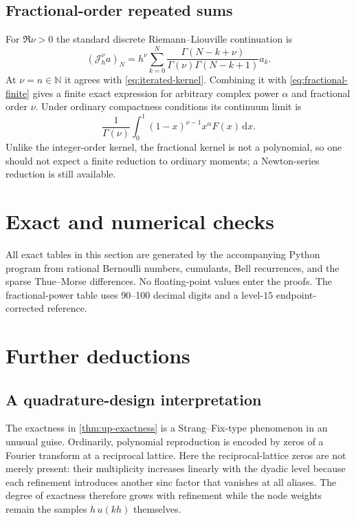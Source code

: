 \documentclass[11pt]{article}
\theoremstyle{definition}
\theoremstyle{remark}
\newcommand{\N}{\mathbb N}
\newcommand{\dd}{\,\mathrm d}
\newcommand{\J}{\mathcal J}
\begin{document}
\subsection{Fractional-order repeated sums}

For $\Re\nu>0$ the standard discrete Riemann--Liouville continuation is
\begin{equation}\label{eq:fractional-iterate}
 (\J_h^\nu a)_N
 =h^\nu\sum_{k=0}^{N}
 \frac{\Gamma(N-k+\nu)}{\Gamma(\nu)\Gamma(N-k+1)}a_k.
\end{equation}
At $\nu=n\in\N$ it agrees with \eqref{eq:iterated-kernel}.  Combining it with
\eqref{eq:fractional-finite} gives a finite exact expression for arbitrary
complex power $\alpha$ and fractional order $\nu$.  Under ordinary compactness
conditions its continuum limit is
\begin{equation}\label{eq:fractional-limit}
 \frac1{\Gamma(\nu)}\int_0^1(1-x)^{\nu-1}x^\alpha F(x)\dd x.
\end{equation}
Unlike the integer-order kernel, the fractional kernel is not a polynomial, so
one should not expect a finite reduction to ordinary moments; a Newton-series
reduction is still available.

\section{Exact and numerical checks}

All exact tables in this section are generated by the accompanying Python
program from rational Bernoulli numbers, cumulants, Bell recurrences, and the
sparse Thue--Morse differences.  No floating-point values enter the proofs.
The fractional-power table uses 90--100 decimal digits and a level-$15$
endpoint-corrected reference.



\section{Further deductions}

\subsection{A quadrature-design interpretation}

The exactness in \cref{thm:up-exactness} is a Strang--Fix-type phenomenon in an
unusual guise.  Ordinarily, polynomial reproduction is encoded by zeros of a
Fourier transform at a reciprocal lattice.  Here the reciprocal-lattice zeros
are not merely present: their multiplicity increases linearly with the dyadic
level because each refinement introduces another sinc factor that vanishes at
all aliases.  The degree of exactness therefore grows with refinement while
the node weights remain the samples $h\,u(kh)$ themselves.
\end{document}
